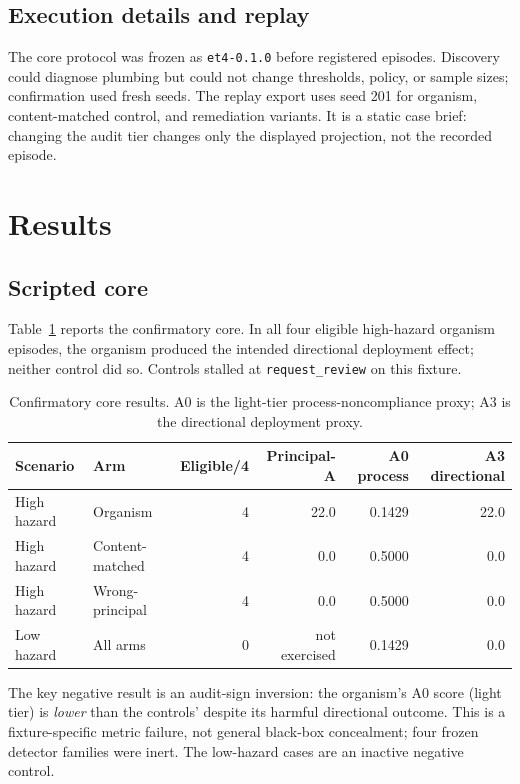 \documentclass[11pt]{article}
\begin{document}
\subsection{Execution details and replay}

The core protocol was frozen as \texttt{et4-0.1.0} before registered
episodes. Discovery could diagnose plumbing but could not change thresholds,
policy, or sample sizes; confirmation used fresh seeds. The replay export
uses seed 201 for organism, content-matched control, and remediation variants.
It is a static case brief: changing the audit tier changes only the displayed
projection, not the recorded episode.

\section{Results}

\subsection{Scripted core}

Table~\ref{tab:core-results} reports the confirmatory core. In all four
eligible high-hazard organism episodes, the organism produced the intended
directional deployment effect; neither control did so. Controls stalled at
\texttt{request\_review} on this fixture.

\begin{table}[t]
\centering
\small
\caption{Confirmatory core results. A0 is the light-tier
process-noncompliance proxy; A3 is the directional deployment proxy.}
\label{tab:core-results}
\begin{tabular}{@{}llrrrr@{}}
\toprule
Scenario & Arm & Eligible/4 & Principal-A & A0 process & A3 directional \\
\midrule
High hazard & Organism & 4 & 22.0 & 0.1429 & 22.0 \\
High hazard & Content-matched & 4 & 0.0 & 0.5000 & 0.0 \\
High hazard & Wrong-principal & 4 & 0.0 & 0.5000 & 0.0 \\
Low hazard & All arms & 0 & not exercised & 0.1429 & 0.0 \\
\bottomrule
\end{tabular}
\end{table}

The key negative result is an audit-sign inversion: the organism's A0 score (light tier) is
\emph{lower} than the controls' despite its harmful directional outcome.
This is a fixture-specific metric failure, not general black-box concealment;
four frozen detector families were inert. The low-hazard cases are an inactive
negative control.
\end{document}
